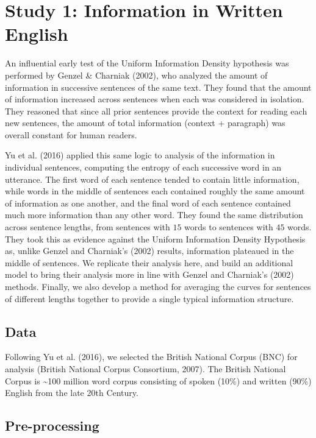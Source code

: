 \documentclass[10pt, letterpaper]{article}
\begin{document}
\hypertarget{study-1-information-in-written-english}{%
\section{Study 1: Information in Written
English}\label{study-1-information-in-written-english}}

An influential early test of the Uniform Information Density hypothesis
was performed by Genzel \& Charniak (2002), who analyzed the amount of
information in successive sentences of the same text. They found that
the amount of information increased across sentences when each was
considered in isolation. They reasoned that since all prior sentences
provide the context for reading each new sentences, the amount of total
information (context + paragraph) was overall constant for human
readers.

Yu et al. (2016) applied this same logic to analysis of the information
in individual sentences, computing the entropy of each successive word
in an utterance. The first word of each sentence tended to contain
little information, while words in the middle of sentences each
contained roughly the same amount of information as one another, and the
final word of each sentence contained much more information than any
other word. They found the same distribution across sentence lengths,
from sentences with \(15\) words to sentences with \(45\) words. They
took this as evidence against the Uniform Information Density Hypothesis
as, unlike Genzel and Charniak's (2002) results, information plateaued
in the middle of sentences. We replicate their analysis here, and build
an additional model to bring their analysis more in line with Genzel and
Charniak's (2002) methods. Finally, we also develop a method for
averaging the curves for sentences of different lengths together to
provide a single typical information structure.

\hypertarget{data}{%
\subsection{Data}\label{data}}

Following Yu et al. (2016), we selected the British National Corpus
(BNC) for analysis (British National Corpus Consortium, 2007). The
British National Corpus is \textasciitilde100 million word corpus
consisting of spoken (10\%) and written (90\%) English from the late
20th Century.

\hypertarget{pre-processing}{%
\subsection{Pre-processing}\label{pre-processing}}
\end{document}
